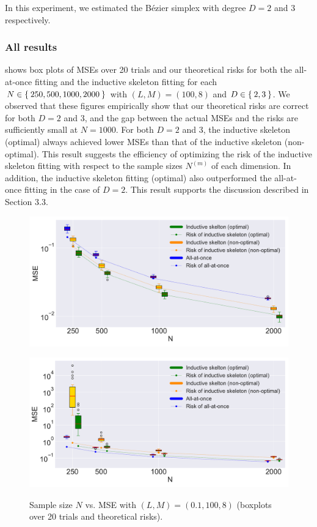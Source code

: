 \documentclass{article}
\begin{document}
In this experiment, we estimated the B\'ezier simplex with degree $D = 2$ and 3 respectively.

\subsubsection{All results}\label{sec:results}
 shows box plots of MSEs over 20 trials and our theoretical risks for both the all-at-once fitting and the inductive skeleton fitting for each $N \in \Set{250, 500, 1000, 2000}$ with $(L, M) = (100, 8)$ and $D \in \Set{2, 3}$.
We observed that these figures empirically show that our theoretical risks are correct for both $D = 2$ and 3, and the gap between the actual MSEs and the risks are sufficiently small at $N = 1000$.
For both $D = 2$ and 3, the inductive skeleton (optimal) always achieved lower MSEs than that of the inductive skeleton (non-optimal).
This result suggests the efficiency of optimizing the risk of the inductive skeleton fitting with respect to the sample sizes $N^{(m)}$ of each dimension.
In addition, the inductive skeleton fitting (optimal) also outperformed the all-at-once fitting in the case of $D = 2$.
This result supports the discussion described in Section 3.3.
\begin{figure}[ht]
 \begin{minipage}{0.49\hsize}
        \centering
    \includegraphics[width=1\textwidth]{neurips2019/fig/D=2_M=8_L=100.pdf}
    \label{fig:mse_vsN_d2}
 \end{minipage}
 \begin{minipage}{0.49\hsize}
        \centering
    \includegraphics[width=1\textwidth]{neurips2019/fig/D=3_M=8_L=100.pdf}
    \label{fig:mse_vsN_d3}
 \end{minipage}
 \caption{Sample size $N$ vs. MSE with $(L,M)=(0.1,100,8)$ (boxplots over 20 trials and theoretical risks).}
 \label{fig:mse_vsN}
\end{figure}
\end{document}
